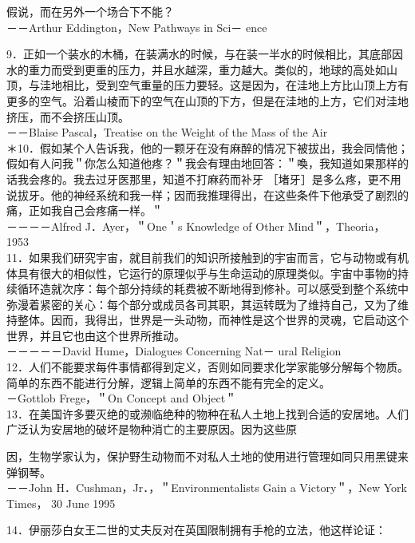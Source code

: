 假说，而在另外一个场合下不能？\\
－－Arthur Eddington，New Pathways in Sci－ ence

9．正如一个装水的木桶，在装满水的时候，与在装一半水的时候相比，其底部因水的重力而受到更重的压力，并且水越深，重力越大。类似的，地球的高处如山顶，与洼地相比，受到空气重量的压力要轻。这是因为，在洼地上方比山顶上方有更多的空气。沿着山棱而下的空气在山顶的下方，但是在洼地的上方，它们对洼地挤压，而不会挤压山顶。\\
－－Blaise Pascal，Treatise on the Weight of the Mass of the Air\\
＊10．假如某个人告诉我，他的一颗牙在没有麻醉的情况下被拔出，我会同情他；假如有人问我＂你怎么知道他疼？＂我会有理由地回答：＂喚，我知道如果那样的话我会疼的。我去过牙医那里，知道不打麻药而补牙 ［堵牙］是多么疼，更不用说拔牙。他的神经系统和我一样；因而我推理得出，在这些条件下他承受了剧烈的痛，正如我自己会疼痛一样。＂\\
－－－－Alfred J．Ayer，＂One＇s Knowledge of Other Mind＂，Theoria， 1953\\
11．如果我们研究宇宙，就目前我们的知识所接触到的宇宙而言，它与动物或有机体具有很大的相似性，它运行的原理似乎与生命运动的原理类似。宇宙中事物的持续循环造就次序：每个部分持续的耗费被不断地得到修补。可以感受到整个系统中弥漫着紧密的关心：每个部分或成员各司其职，其运转既为了维持自己，又为了维持整体。因而，我得出，世界是一头动物，而神性是这个世界的灵魂，它启动这个世界，并且它也由这个世界所推动。\\
－－－－－David Hume，Dialogues Concerning Nat－ ural Religion\\
12．人们不能要求每件事情都得到定义，否则如同要求化学家能够分解每个物质。简单的东西不能进行分解，逻辑上简单的东西不能有完全的定义。\\
－Gottlob Frege，＂On Concept and Object＂\\
13．在美国许多要灭绝的或濒临绝种的物种在私人土地上找到合适的安居地。人们广泛认为安居地的破坏是物种消亡的主要原因。因为这些原

因，生物学家认为，保护野生动物而不对私人土地的使用进行管理如同只用黑键来弹钢琴。\\
－－John H．Cushman，Jr．，＂Environmentalists Gain a Victory＂，New York Times， 30 June 1995

14．伊丽莎白女王二世的丈夫反对在英国限制拥有手枪的立法，他这样论证：

